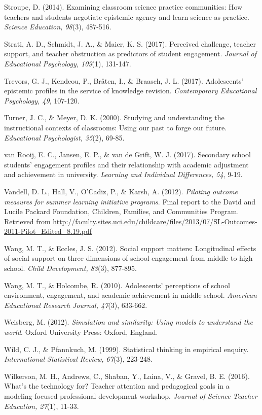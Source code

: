 \documentclass[]{msu-thesis}
\theoremstyle{definition}
\theoremstyle{definition}
\theoremstyle{definition}
\theoremstyle{remark}
\begin{document}
Stroupe, D. (2014). Examining classroom science practice communities:
How teachers and students negotiate epistemic agency and learn
science‐as‐practice. \emph{Science Education, 98}(3), 487-516.

Strati, A. D., Schmidt, J. A., \& Maier, K. S. (2017). Perceived
challenge, teacher support, and teacher obstruction as predictors of
student engagement. \emph{Journal of Educational Psychology, 109}(1),
131-147.

Trevors, G. J., Kendeou, P., Bråten, I., \& Braasch, J. L. (2017).
Adolescents' epistemic profiles in the service of knowledge revision.
\emph{Contemporary Educational Psychology, 49}, 107-120.

Turner, J. C., \& Meyer, D. K. (2000). Studying and understanding the
instructional contexts of classrooms: Using our past to forge our
future. \emph{Educational Psychologist, 35}(2), 69-85.

van Rooij, E. C., Jansen, E. P., \& van de Grift, W. J. (2017).
Secondary school students' engagement profiles and their relationship
with academic adjustment and achievement in university. \emph{Learning
and Individual Differences, 54}, 9-19.

Vandell, D. L., Hall, V., O'Cadiz, P., \& Karsh, A. (2012).
\emph{Piloting outcome measures for summer learning initiative
programs}. Final report to the David and Lucile Packard Foundation,
Children, Families, and Communities Program. Retrieved from
\url{http://faculty.sites.uci.edu/childcare/files/2013/07/SL-Outcomes-2011-Pilot_Edited_8.19.pdf}

Wang, M. T., \& Eccles, J. S. (2012). Social support matters:
Longitudinal effects of social support on three dimensions of school
engagement from middle to high school. \emph{Child Development, 83}(3),
877-895.

Wang, M. T., \& Holcombe, R. (2010). Adolescents' perceptions of school
environment, engagement, and academic achievement in middle school.
\emph{American Educational Research Journal, 47}(3), 633-662.

Weisberg, M. (2012). \emph{Simulation and similarity: Using models to
understand the world}. Oxford University Press: Oxford, England.

Wild, C. J., \& Pfannkuch, M. (1999). Statistical thinking in empirical
enquiry. \emph{International Statistical Review, 67}(3), 223-248.

Wilkerson, M. H., Andrews, C., Shaban, Y., Laina, V., \& Gravel, B. E.
(2016). What's the technology for? Teacher attention and pedagogical
goals in a modeling-focused professional development workshop.
\emph{Journal of Science Teacher Education, 27}(1), 11-33.
\end{document}
